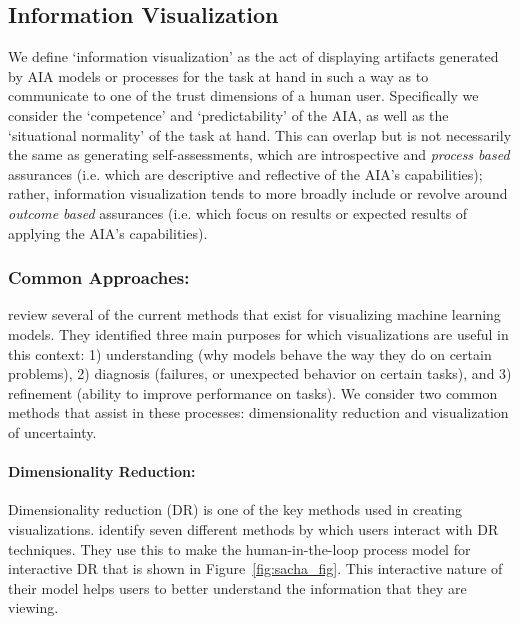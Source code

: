\subsection{Information Visualization} \label{sec:vis_dr}
We define `information visualization' as the act of displaying artifacts generated by AIA models or processes for the task at hand in such a way as to communicate to one of the trust dimensions of a human user. Specifically we consider the `competence' and `predictability' of the AIA, as well as the `situational normality' of the task at hand. This can overlap but is not necessarily the same as generating self-assessments, which are introspective and \emph{process based} assurances (i.e. which are descriptive and reflective of the AIA's capabilities); rather, information visualization tends to more broadly include or revolve around \emph{outcome based} assurances (i.e. which focus on results or expected results of applying the AIA's capabilities).  

\subsubsection{Common Approaches:}
\citet{Liu2017-xw} review several of the current methods that exist for visualizing machine learning models. They identified three main purposes for which visualizations are useful in this context: 1) understanding (why models behave the way they do on certain problems), 2) diagnosis (failures, or unexpected behavior on certain tasks), and 3) refinement (ability to improve performance on tasks). 
We consider two common methods that assist in these processes: dimensionality reduction and visualization of uncertainty.

\paragraph{Dimensionality Reduction:}
Dimensionality reduction (DR) is one of the key methods used in creating visualizations. \citet{Sacha2017-hf} identify seven different methods by which users interact with DR techniques. They use this to make the human-in-the-loop process model for interactive DR that is shown in Figure~\ref{fig:sacha_fig}. This interactive nature of their model helps users to better understand the information that they are viewing.

